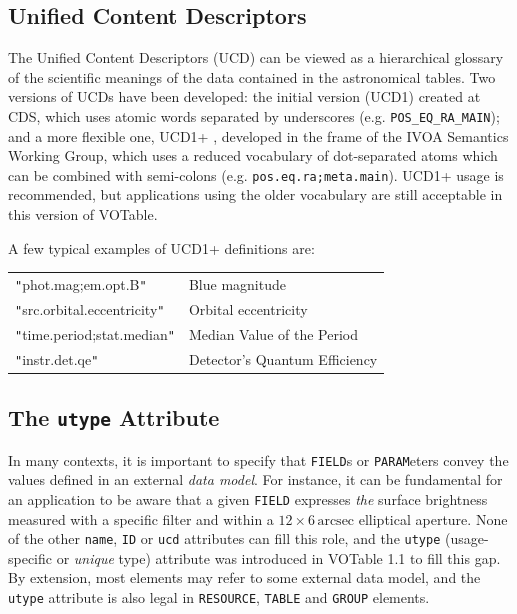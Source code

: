 \documentclass[11pt,a4paper]{ivoa}
\let\fg=\color
\def\attr#1{{\tt{\fg{DarkRed}#1}}}
\def\elem#1{{\tt{\fg{DarkRed}#1}}}
\def\literalvalue#1{{\tt"}{{\fg{DarkPurple}#1}}{\tt"}}
\begin{document}
\subsection{Unified Content Descriptors}
\label{sec:ucd}

The Unified Content Descriptors (UCD) can be viewed as a
hierarchical glossary of the scientific meanings of the data
contained in the astronomical tables.
Two versions of UCDs have been developed:
the initial version (UCD1) created at CDS, which uses
atomic words separated by underscores (e.g. {\tt POS\_EQ\_RA\_MAIN});
and a more flexible one, UCD1+ \citep{2023ivoa.spec.0125C},
developed in the frame of the IVOA Semantics Working Group, which uses
a reduced vocabulary of dot-separated atoms which can be
combined with semi-colons (e.g. {\tt pos.eq.ra;meta.main}).
UCD1+ usage is recommended, but applications using the older
vocabulary are still acceptable in this version of VOTable.

\noindent A few typical examples of UCD1+ definitions
 are:

\begin{tabular}{ll}
{\literalvalue{phot.mag;em.opt.B}}        &  Blue magnitude \\
{\literalvalue{src.orbital.eccentricity}} &  Orbital eccentricity \\
{\literalvalue{time.period;stat.median}}  &  Median Value of the Period \\
{\literalvalue{instr.det.qe}}             &  Detector's Quantum Efficiency \\
\end{tabular}


\subsection{The \attr{utype} Attribute}
\label{sec:utype}
In many contexts, it is important to specify that \elem{FIELD}s or
\elem{PARAM}eters convey the values defined in an external {\em data
model}. For instance, it can be fundamental for an application to
be aware that a given \elem{FIELD} expresses \emph{the} surface brightness
measured with a specific filter and within a
$12\times6\,\textrm{arcsec}$ elliptical aperture.
None of the other \attr{name}, \attr{ID}
or \attr{ucd} attributes can fill this role, and
the \attr{utype} (usage-specific or {\em unique} type) attribute was
introduced in VOTable 1.1 to fill this gap.
By extension, most elements may refer to some external data model,
and the \attr{utype} attribute is also legal in \elem{RESOURCE},
\elem{TABLE} and \elem{GROUP} elements.
\end{document}
